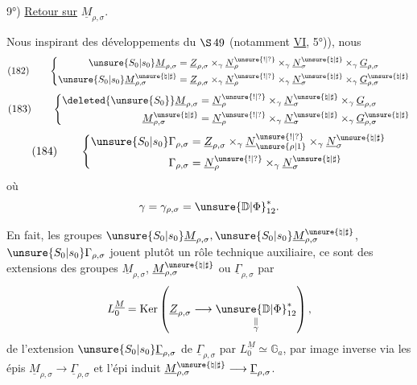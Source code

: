 

9°) \uline{Retour sur} \(\underline M_{\rho,\sigma}\).

Nous inspirant des développements du
\(\S\,49\) (notamment \uline{VI}, 5°)), nous 
\[
(182)\qquad
\left\{
\begin{aligned}
\unsure{S_0|s_0}\underline M_{\rho,\sigma}
&=\underline Z_{\rho,\sigma}
\times_\gamma\underline N_\rho^{\unsure{!|?}}
\times_\gamma\underline N_\sigma^{\unsure{\natural|\sharp}}
\times_\gamma\underline G_{\rho,\sigma}\\
\unsure{S_0|s_0}\underline M_{\rho,\sigma}^{\unsure{\natural|\sharp}}
&=\underline Z_{\rho,\sigma}
\times_\gamma\underline N_\rho^{\unsure{!|?}}
\times_\gamma\underline N_\sigma^{\unsure{\natural|\sharp}}
\times_\gamma\underline G_{\rho,\sigma}^{\unsure{\natural|\sharp}}
\end{aligned}
\right.
\]
\[
(183)\qquad
\left\{
\begin{aligned}
\deleted{\unsure{S_0}}\underline M_{\rho,\sigma}
&=\underline N_\rho^{\unsure{!|?}}
\times_\gamma\underline N_\sigma^{\unsure{\natural|\sharp}}
\times_\gamma\underline G_{\rho,\sigma}\\
\underline M_{\rho,\sigma}^{\unsure{\natural|\sharp}}
&=\underline N_\rho^{\unsure{!|?}}
\times_\gamma\underline N_\sigma^{\unsure{\natural|\sharp}}
\times_\gamma\underline G_{\rho,\sigma}^{\unsure{\natural|\sharp}}
\end{aligned}
\right.
\]
\[
(184)\qquad
\left\{
\begin{aligned}
\unsure{S_0|s_0}\Gamma_{\rho,\sigma}
&=\underline Z_{\rho,\sigma}
\times_\gamma\underline N_{\unsure{\rho|1}}^{\unsure{!|?}}
\times_\gamma\underline N_\sigma^{\unsure{\natural|\sharp}}\\
\Gamma_{\rho,\sigma}
&=\underline N_\rho^{\unsure{!|?}}
\times_\gamma\underline N_\sigma^{\unsure{\natural|\sharp}}
\end{aligned}
\right.
\]
où \deleted{\(\unsure{\gamma=}\)}
\[
\gamma=\gamma_{\rho,\sigma}=\unsure{\mathbb D|\Phi}_{12}^{*}.
\]

En fait, les groupes
\(\unsure{S_0|s_0}\underline M_{\rho,\sigma},
\unsure{S_0|s_0}\underline M_{\rho,\sigma}^{\unsure{\natural|\sharp}}\),
\(\unsure{S_0|s_0}\Gamma_{\rho,\sigma}\)
jouent plutôt un rôle technique auxiliaire, ce sont des extensions des
groupes \(\underline M_{\rho,\sigma}\),
\(\underline M_{\rho,\sigma}^{\unsure{\natural|\sharp}}\)
ou \(\underline\Gamma_{\rho,\sigma}\) par
\[
L_0^{\underline M}
=\operatorname{Ker}\left(
\underline Z_{\rho,\sigma}\longrightarrow
\underset{\substack{\parallel\\\gamma}}{\unsure{\mathbb D|\Phi}_{12}^{*}}
\right),
\]
de l'extension
\(\unsure{S_0|s_0}\underline\Gamma_{\rho,\sigma}\)
de \(\underline\Gamma_{\rho,\sigma}\) par
\(L_0^{\underline M}\simeq\mathbb G_a\),
par image inverse via les épis
\(\underline M_{\rho,\sigma}\longrightarrow\underline\Gamma_{\rho,\sigma}\)
et l'épi induit
\(\underline M_{\rho,\sigma}^{\unsure{\natural|\sharp}}
\longrightarrow\underline\Gamma_{\rho,\sigma}\).

